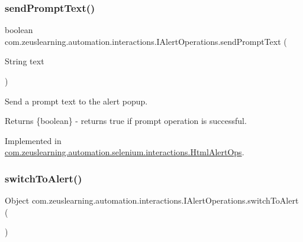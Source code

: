 \hypertarget{interfacecom_1_1zeuslearning_1_1automation_1_1interactions_1_1IAlertOperations_a1a33aeab4f1ae33df2a7abb46fd0edd3}{}\label{interfacecom_1_1zeuslearning_1_1automation_1_1interactions_1_1IAlertOperations_a1a33aeab4f1ae33df2a7abb46fd0edd3} 
\subsubsection{\texorpdfstring{send\+Prompt\+Text()}{sendPromptText()}}
{\footnotesize\ttfamily boolean com.\+zeuslearning.\+automation.\+interactions.\+I\+Alert\+Operations.\+send\+Prompt\+Text (\begin{DoxyParamCaption}\item[{String}]{text }\end{DoxyParamCaption})}

Send a prompt text to the alert popup.

\begin{DoxyReturn}{Returns}
\{boolean\} -\/ returns {\ttfamily true} if prompt operation is successful. 
\end{DoxyReturn}


Implemented in \hyperlink{classcom_1_1zeuslearning_1_1automation_1_1selenium_1_1interactions_1_1HtmlAlertOps_a22d69cc0ac8d155f99a5dc1e48db142d}{com.\+zeuslearning.\+automation.\+selenium.\+interactions.\+Html\+Alert\+Ops}.

\hypertarget{interfacecom_1_1zeuslearning_1_1automation_1_1interactions_1_1IAlertOperations_a8f0851a83f41aef25635fb1b32f15c08}{}\label{interfacecom_1_1zeuslearning_1_1automation_1_1interactions_1_1IAlertOperations_a8f0851a83f41aef25635fb1b32f15c08} 
\subsubsection{\texorpdfstring{switch\+To\+Alert()}{switchToAlert()}}
{\footnotesize\ttfamily Object com.\+zeuslearning.\+automation.\+interactions.\+I\+Alert\+Operations.\+switch\+To\+Alert (\begin{DoxyParamCaption}{ }\end{DoxyParamCaption})}

